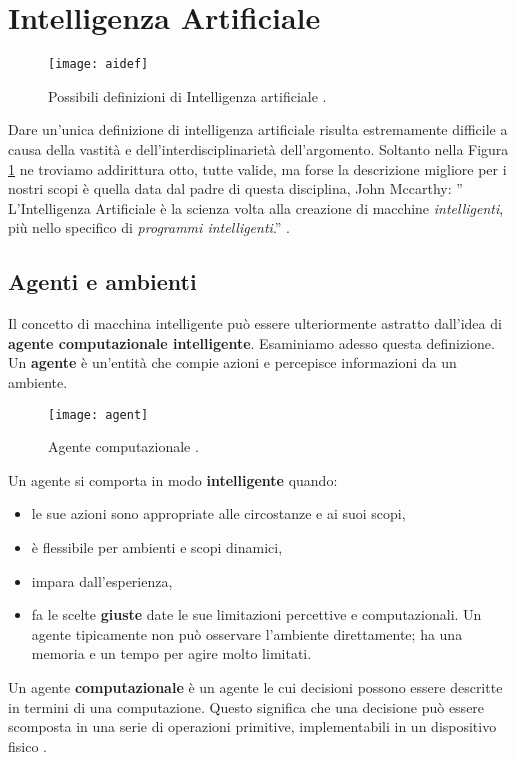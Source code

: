 \section{Intelligenza Artificiale}

\begin{figure}
    \texttt{[image: aidef]}
    \caption{Possibili definizioni di Intelligenza artificiale \cite{aima}.}
    \label{fig:ai}
  \end{figure}
Dare un'unica definizione di intelligenza artificiale risulta estremamente difficile a causa della vastità
e dell'interdisciplinarietà dell'argomento. Soltanto nella Figura \ref{fig:ai} ne troviamo addirittura otto, tutte valide, ma forse
la descrizione  migliore per i nostri scopi  è quella data dal padre di questa disciplina, John Mccarthy:
'' L'Intelligenza Artificiale è la scienza volta alla creazione di macchine  \emph{intelligenti},
più nello specifico di \emph{programmi intelligenti}.'' \cite{ai}.
\subsection{Agenti e ambienti}
Il concetto di macchina intelligente può essere ulteriormente
astratto dall'idea di \textbf{agente computazionale intelligente}. Esaminiamo adesso questa definizione.
Un \textbf{agente} è un'entità che compie azioni
e percepisce informazioni da un ambiente.

\begin{figure}
  \centering
  \texttt{[image: agent]}
  \caption{Agente computazionale \cite{aima}.}
  \label{fig:agente}
\end{figure}

Un agente si comporta in modo \textbf{intelligente} quando:
\begin{itemize}
  \item le sue azioni sono appropriate alle circostanze e ai suoi scopi,
  \item è flessibile per ambienti e scopi dinamici,
  \item impara dall'esperienza,
  \item fa le scelte \textbf{giuste} date le sue limitazioni percettive e computazionali. Un agente tipicamente
  non può osservare l'ambiente direttamente; ha una memoria e un tempo per agire molto limitati.
\end{itemize}
 Un agente \textbf{computazionale} è un agente le cui decisioni possono essere descritte in termini di una
 computazione. Questo significa che una decisione può essere scomposta in una serie di operazioni primitive,
 implementabili in un dispositivo fisico \cite{PooleMackworth17}.
